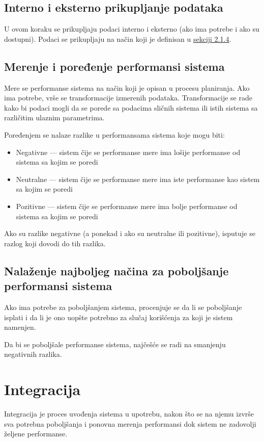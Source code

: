 \documentclass[12pt]{report}
\begin{document}
\subsection{Interno i eksterno prikupljanje podataka}
U ovom koraku se prikupljaju podaci interno i eksterno (ako ima potrebe i ako su dostupni). Podaci se prikupljaju na način koji je definisan u \hyperref[sec:izbor_nacina_prikupljanja_podataka]{sekciji 2.1.4}.

\subsection{Merenje i poređenje performansi sistema}
Mere se performanse sistema na način koji je opisan u procesu planiranja. Ako ima potrebe, vrše se transformacije izmerenih podataka. Transformacije se rade kako bi podaci mogli da se porede sa podacima sličnih sistema ili istih sistema sa različitim ulaznim parametrima.

Poređenjem se nalaze razlike u performansama sistema koje mogu biti:
\begin{samepage}
    \begin{itemize}
        \item Negativne --- sistem čije se performanse mere ima lošije performanse od sistema sa kojim se poredi
        \item Neutralne --- sistem čije se performanse mere ima iste performanse kao sistem sa kojim se poredi
        \item Pozitivne --- sistem čije se performanse mere ima bolje performanse od sistema sa kojim se poredi
    \end{itemize}
\end{samepage}

Ako su razlike negativne (a ponekad i ako su neutralne ili pozitivne), isputuje se razlog koji dovodi do tih razlika.

\subsection{Nalaženje najboljeg načina za poboljšanje performansi sistema}
Ako ima potrebe za poboljšanjem sistema, procenjuje se da li se poboljšanje isplati i da li je ono uopšte potrebno za slučaj korišćenja za koji je sistem namenjen.

Da bi se poboljšale performanse sistema, najčešće se radi na smanjenju negativnih razlika.

\section{Integracija}
Integracija je proces uvođenja sistema u upotrebu, nakon što se na njemu izvrše sva potrebna poboljšanja i ponovna merenja performansi dok sistem ne zadovolji željene performanse.
\end{document}
